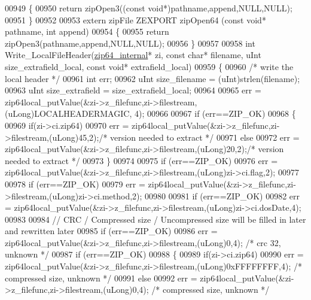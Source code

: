 \begin{DoxyCode}
00949 \{
00950     \textcolor{keywordflow}{return} zipOpen3((\textcolor{keyword}{const} \textcolor{keywordtype}{void}*)pathname,append,NULL,NULL);
00951 \}
00952 
00953 \textcolor{keyword}{extern} zipFile ZEXPORT zipOpen64 (\textcolor{keyword}{const} \textcolor{keywordtype}{void}* pathname, \textcolor{keywordtype}{int} append)
00954 \{
00955     \textcolor{keywordflow}{return} zipOpen3(pathname,append,NULL,NULL);
00956 \}
00957 
00958 \textcolor{keywordtype}{int} Write\_LocalFileHeader(\hyperlink{structzip64__internal}{zip64\_internal}* zi, \textcolor{keyword}{const} \textcolor{keywordtype}{char}* filename, uInt 
      size\_extrafield\_local, \textcolor{keyword}{const} \textcolor{keywordtype}{void}* extrafield\_local)
00959 \{
00960   \textcolor{comment}{/* write the local header */}
00961   \textcolor{keywordtype}{int} err;
00962   uInt size\_filename = (uInt)strlen(filename);
00963   uInt size\_extrafield = size\_extrafield\_local;
00964 
00965   err = zip64local\_putValue(&zi->z\_filefunc,zi->filestream,(uLong)LOCALHEADERMAGIC, 4);
00966 
00967   \textcolor{keywordflow}{if} (err==ZIP\_OK)
00968   \{
00969     \textcolor{keywordflow}{if}(zi->ci.zip64)
00970       err = zip64local\_putValue(&zi->z\_filefunc,zi->filestream,(uLong)45,2);\textcolor{comment}{/* version needed to extract */}
00971     \textcolor{keywordflow}{else}
00972       err = zip64local\_putValue(&zi->z\_filefunc,zi->filestream,(uLong)20,2);\textcolor{comment}{/* version needed to extract */}
00973   \}
00974 
00975   \textcolor{keywordflow}{if} (err==ZIP\_OK)
00976     err = zip64local\_putValue(&zi->z\_filefunc,zi->filestream,(uLong)zi->ci.flag,2);
00977 
00978   \textcolor{keywordflow}{if} (err==ZIP\_OK)
00979     err = zip64local\_putValue(&zi->z\_filefunc,zi->filestream,(uLong)zi->ci.method,2);
00980 
00981   \textcolor{keywordflow}{if} (err==ZIP\_OK)
00982     err = zip64local\_putValue(&zi->z\_filefunc,zi->filestream,(uLong)zi->ci.dosDate,4);
00983 
00984   \textcolor{comment}{// CRC / Compressed size / Uncompressed size will be filled in later and rewritten later}
00985   \textcolor{keywordflow}{if} (err==ZIP\_OK)
00986     err = zip64local\_putValue(&zi->z\_filefunc,zi->filestream,(uLong)0,4); \textcolor{comment}{/* crc 32, unknown */}
00987   \textcolor{keywordflow}{if} (err==ZIP\_OK)
00988   \{
00989     \textcolor{keywordflow}{if}(zi->ci.zip64)
00990       err = zip64local\_putValue(&zi->z\_filefunc,zi->filestream,(uLong)0xFFFFFFFF,4); \textcolor{comment}{/* compressed size,
       unknown */}
00991     \textcolor{keywordflow}{else}
00992       err = zip64local\_putValue(&zi->z\_filefunc,zi->filestream,(uLong)0,4); \textcolor{comment}{/* compressed size, unknown */}

\end{DoxyCode}
